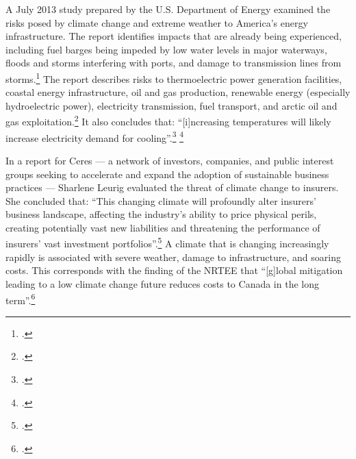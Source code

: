 A July 2013 study prepared by the U.S. Department of Energy examined the risks posed by climate change and extreme weather to America's energy infrastructure.
The report identifies impacts that are already being experienced, including fuel barges being impeded by low water levels in major waterways, floods and storms interfering with ports, and damage to transmission lines from storms.\footcite[][]{EnergyBreakdowns}
The report describes risks to thermoelectric power generation facilities, coastal energy infrastructure, oil and gas production, renewable energy (especially hydroelectric power), electricity transmission, fuel transport, and arctic oil and gas exploitation.\footcite[][p. I]{EnergySectorVulnerabilities}
It also concludes that: ``[i]ncreasing temperatures will likely increase electricity demand for cooling''.\footcite[][p. I]{EnergySectorVulnerabilities} \footcite[See also: ][]{USEffectsOnEnergy}



In a report for Ceres --- a  network of investors, companies, and public interest groups seeking to accelerate and expand the adoption of sustainable business practices --- Sharlene Leurig evaluated the threat of climate change to insurers.
She concluded that: ``This changing climate will profoundly alter insurers' business landscape, affecting the industry's ability to price physical perils, creating potentially vast new liabilities and threatening the performance of insurers' vast investment portfolios''.\footcite[][p. 9]{ClimateRiskInsurers}
A climate that is changing increasingly rapidly is associated with severe weather, damage to infrastructure, and soaring costs.
This corresponds with the finding of the NRTEE that ``[g]lobal mitigation leading to a low climate change future reduces costs to Canada in the long term''.\footcite[][p. 16]{NRTEEPrice}



